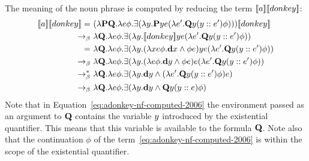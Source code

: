 \begin{example}
The meaning of the noun phrase  is computed by reducing the term $[\![a]\!] [\![donkey]\!] $:
\begin{align}
 \trr{\I{a}} \trr{\I{donkey}} 
 = \  & ( \lambda \P2 \Q2. \lambda e \phi. \exists (\lambda \y1. \P2  \y1 e ( \lambda e'. \Q2 \y1  (\upii{\y1}{e'}) \phi ) ) ) \trr{\I{donkey}} \notag \\ 
\bconv \ &  \lambda  \Q2. \lambda e \phi. \exists (\lambda \y1. \trr{\I{donkey}}  \y1 e ( \lambda e'. \Q2 \y1  (\upii{\y1}{e'}) \phi ) )  \notag \\ 
= \ &   \lambda  \Q2. \lambda e \phi. \exists (\lambda \y1. (\lambda \x1 e \phi.  \cdonkey \x1  \land \phi e )  \y1 e ( \lambda e'. \Q2 \y1  (\upii{\y1}{e'}) \phi ) )  \notag \\ 
\bconv \ & \lambda  \Q2. \lambda e \phi. \exists (\lambda \y1. (\lambda  e \phi.  \cdonkey \y1  \land \phi e )   e ( \lambda e'. \Q2 \y1  (\upii{\y1}{e'}) \phi ) )  \notag \\ 
\bred \  & \lambda  \Q2. \lambda e \phi. \exists (\lambda \y1.  \cdonkey \y1  \land  ( \lambda e'. \Q2 \y1  (\upii{\y1}{e'}) \phi ) e )  \notag \\ 
\bconv \  &  \lambda  \Q2. \lambda e \phi. \exists (\lambda \y1.  \cdonkey \y1  \land  \Q2 \y1  (\upii{\y1}{e}) \phi )  \label{eq:adonkey-nf-computed-2006}
\end{align}
Note that in Equation~\eqref{eq:adonkey-nf-computed-2006} the environment passed as an argument to $\Q2$ contains the variable $\y1$ introduced by the existential quantifier. This means that this variable is available to the formula $\Q2$. 
Note also that the continuation $\phi$ of the term~\eqref{eq:adonkey-nf-computed-2006}  is within the scope of the existential quantifier. 


\end{example}
